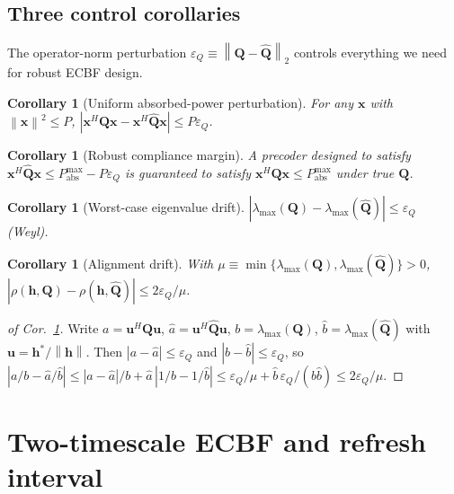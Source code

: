 \documentclass[11pt,a4paper]{article}
\newtheorem{corollary}[theorem]{Corollary}
\theoremstyle{definition}
\newcommand{\xx}{\mathbf{x}}
\newcommand{\hh}{\mathbf{h}}
\newcommand{\Q}{\mathbf{Q}}
\newcommand{\Qhat}{\widehat{\mathbf{Q}}}
\newcommand{\lammax}{\lambda_{\max}}
\newcommand{\norm}[1]{\left\lVert #1 \right\rVert}
\newcommand{\abs}[1]{\left\lvert #1 \right\rvert}
\begin{document}
\subsection{Three control corollaries}
\label{sec:control-corollaries}

The operator-norm perturbation
$\varepsilon_Q\equiv\norm{\Q-\Qhat}_2$ controls everything we need for
robust ECBF design.

\begin{corollary}[Uniform absorbed-power perturbation]
\label{cor:uniform-power}
For any $\xx$ with $\norm{\xx}^2\le P$,
$\abs{\xx^H\Q\xx-\xx^H\Qhat\xx} \le P\varepsilon_Q$.
\end{corollary}

\begin{corollary}[Robust compliance margin]
\label{cor:robust-margin}
A precoder designed to satisfy
$\xx^H\Qhat\xx \le P_{\mathrm{abs}}^{\max} - P\varepsilon_Q$
is guaranteed to satisfy $\xx^H\Q\xx \le P_{\mathrm{abs}}^{\max}$ under
true $\Q$.
\end{corollary}

\begin{corollary}[Worst-case eigenvalue drift]
$\abs{\lammax(\Q)-\lammax(\Qhat)}\le\varepsilon_Q$ (Weyl).
\end{corollary}

\begin{corollary}[Alignment drift]
\label{cor:rho-drift}
With $\mu\equiv\min\{\lammax(\Q),\lammax(\Qhat)\}>0$,
$\abs{\rho(\hh,\Q)-\rho(\hh,\Qhat)}\le 2\varepsilon_Q/\mu$.
\end{corollary}

\begin{proof}[of Cor.~\ref{cor:rho-drift}]
Write $a=\mathbf{u}^H\Q\mathbf{u}$, $\widehat a=\mathbf{u}^H\Qhat\mathbf{u}$,
$b=\lammax(\Q)$, $\widehat b=\lammax(\Qhat)$ with
$\mathbf{u}=\hh^*/\norm{\hh}$. Then
$\abs{a-\widehat a}\le\varepsilon_Q$ and
$\abs{b-\widehat b}\le\varepsilon_Q$, so
$\abs{a/b-\widehat a/\widehat b}
 \le\abs{a-\widehat a}/b + \widehat a\,\abs{1/b-1/\widehat b}
 \le\varepsilon_Q/\mu + \widehat b\,\varepsilon_Q/(b\widehat b)
 \le 2\varepsilon_Q/\mu$.
\end{proof}

\section{Two-timescale ECBF and refresh interval}
\label{sec:timescales}
\end{document}
